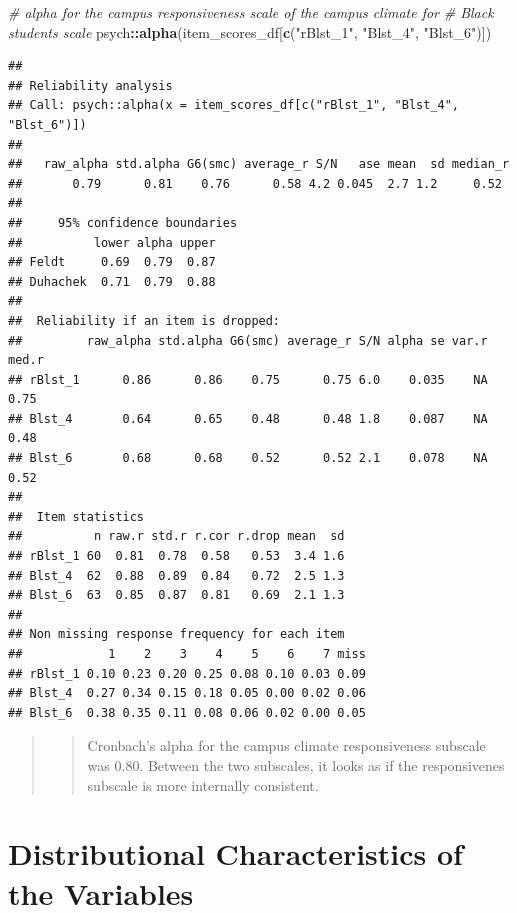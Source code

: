 \documentclass[
  11pt,
]{book}
\newenvironment{Shaded}{\begin{snugshade}}{\end{snugshade}}
\newcommand{\CommentTok}[1]{\textcolor[rgb]{0.37,0.37,0.37}{\textit{#1}}}
\newcommand{\FunctionTok}[1]{\textcolor[rgb]{0.27,0.27,0.27}{\textbf{#1}}}
\newcommand{\NormalTok}[1]{#1}
\newcommand{\SpecialCharTok}[1]{\textcolor[rgb]{0.43,0.43,0.43}{\textbf{#1}}}
\newcommand{\StringTok}[1]{\textcolor[rgb]{0.5,0.5,0.5}{#1}}
\begin{document}
\begin{Shaded}
\begin{Highlighting}[]
\CommentTok{\# alpha for the campus responsiveness scale of the campus climate for}
\CommentTok{\# Black students scale}
\NormalTok{psych}\SpecialCharTok{::}\FunctionTok{alpha}\NormalTok{(item\_scores\_df[}\FunctionTok{c}\NormalTok{(}\StringTok{"rBlst\_1"}\NormalTok{, }\StringTok{"Blst\_4"}\NormalTok{, }\StringTok{"Blst\_6"}\NormalTok{)])}
\end{Highlighting}
\end{Shaded}

\begin{verbatim}
## 
## Reliability analysis   
## Call: psych::alpha(x = item_scores_df[c("rBlst_1", "Blst_4", "Blst_6")])
## 
##   raw_alpha std.alpha G6(smc) average_r S/N   ase mean  sd median_r
##       0.79      0.81    0.76      0.58 4.2 0.045  2.7 1.2     0.52
## 
##     95% confidence boundaries 
##          lower alpha upper
## Feldt     0.69  0.79  0.87
## Duhachek  0.71  0.79  0.88
## 
##  Reliability if an item is dropped:
##         raw_alpha std.alpha G6(smc) average_r S/N alpha se var.r med.r
## rBlst_1      0.86      0.86    0.75      0.75 6.0    0.035    NA  0.75
## Blst_4       0.64      0.65    0.48      0.48 1.8    0.087    NA  0.48
## Blst_6       0.68      0.68    0.52      0.52 2.1    0.078    NA  0.52
## 
##  Item statistics 
##          n raw.r std.r r.cor r.drop mean  sd
## rBlst_1 60  0.81  0.78  0.58   0.53  3.4 1.6
## Blst_4  62  0.88  0.89  0.84   0.72  2.5 1.3
## Blst_6  63  0.85  0.87  0.81   0.69  2.1 1.3
## 
## Non missing response frequency for each item
##            1    2    3    4    5    6    7 miss
## rBlst_1 0.10 0.23 0.20 0.25 0.08 0.10 0.03 0.09
## Blst_4  0.27 0.34 0.15 0.18 0.05 0.00 0.02 0.06
## Blst_6  0.38 0.35 0.11 0.08 0.06 0.02 0.00 0.05
\end{verbatim}

\begin{quote}
\begin{quote}
Cronbach's alpha for the campus climate responsiveness subscale was 0.80. Between the two subscales, it looks as if the responsivenes subscale is more internally consistent.
\end{quote}
\end{quote}

\hypertarget{distributional-characteristics-of-the-variables}{%
\section{Distributional Characteristics of the Variables}\label{distributional-characteristics-of-the-variables}}
\end{document}
